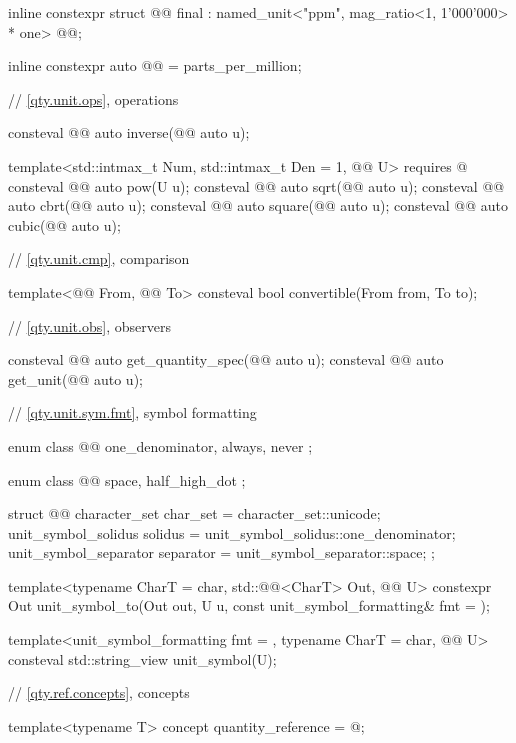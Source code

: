 \begin{codeblock}
{inline constexpr struct @@ final :
    named_unit<"ppm", mag_ratio<1, 1'000'000> * one> {
} @@;

inline constexpr auto @@ = parts_per_million;

// \ref{qty.unit.ops}, operations

consteval @@ auto inverse(@@ auto u);

template<std::intmax_t Num, std::intmax_t Den = 1, @@ U>
  requires @\seebelownc@
consteval @@ auto pow(U u);
consteval @@ auto sqrt(@@ auto u);
consteval @@ auto cbrt(@@ auto u);
consteval @@ auto square(@@ auto u);
consteval @@ auto cubic(@@ auto u);

// \ref{qty.unit.cmp}, comparison

template<@@ From, @@ To>
consteval bool convertible(From from, To to);

// \ref{qty.unit.obs}, observers

consteval @@ auto get_quantity_spec(@@ auto u);
consteval @@ auto get_unit(@@ auto u);

// \ref{qty.unit.sym.fmt}, symbol formatting

enum class @@ {
  one_denominator,
  always,
  never
};

enum class @@ {
  space,
  half_high_dot
};

struct @@ {
  character_set char_set = character_set::unicode;
  unit_symbol_solidus solidus = unit_symbol_solidus::one_denominator;
  unit_symbol_separator separator = unit_symbol_separator::space;
};

template<typename CharT = char, std::@@<CharT> Out, @@ U>
constexpr Out unit_symbol_to(Out out, U u, const unit_symbol_formatting& fmt = {});

template<unit_symbol_formatting fmt = {}, typename CharT = char, @@ U>
consteval std::string_view unit_symbol(U);

// \ref{qty.ref.concepts}, concepts

template<typename T>
concept quantity_reference = @\seebelownc@;

}
\end{codeblock}
